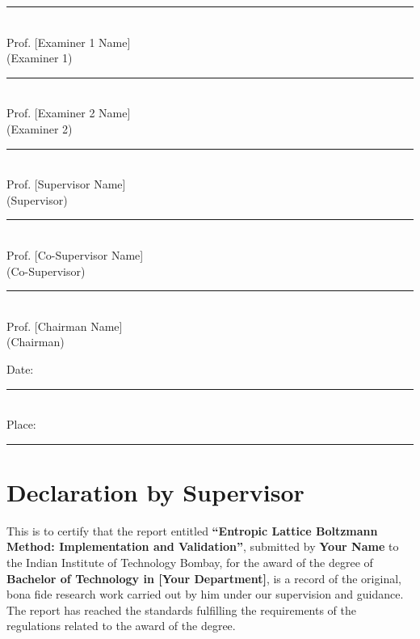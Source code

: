 \documentclass[12pt, a4paper, twoside, openright]{report}
\theoremstyle{definition}
\theoremstyle{remark}
\newcommand\myemptypage{
    \null
    \thispagestyle{empty}
    \addtocounter{page}{-1}
    \newpage
}
\def\thesistitle{Entropic Lattice Boltzmann Method: Implementation and Validation}
\def\authorname{Your Name}
\def\univname{Indian Institute of Technology Bombay}
\begin{document}
\noindent
\begin{minipage}[t]{0.45\textwidth}
\centering
\rule{6cm}{0.4pt}\\
Prof. [Examiner 1 Name]\\
(Examiner 1)
\end{minipage}%
\hfill
\begin{minipage}[t]{0.45\textwidth}
\centering
\rule{6cm}{0.4pt}\\
Prof. [Examiner 2 Name]\\
(Examiner 2)
\end{minipage}

\vspace{2cm}

\noindent
\begin{minipage}[t]{0.45\textwidth}
\centering
\rule{6cm}{0.4pt}\\
Prof. [Supervisor Name]\\
(Supervisor)
\end{minipage}%
\hfill
\begin{minipage}[t]{0.45\textwidth}
\centering
\rule{6cm}{0.4pt}\\
Prof. [Co-Supervisor Name]\\
(Co-Supervisor)
\end{minipage}

\vspace{2cm}

\noindent
\begin{center}
\rule{6cm}{0.4pt}\\
Prof. [Chairman Name]\\
(Chairman)
\end{center}

\vspace{2cm}

\noindent Date: \rule{3cm}{0.4pt}\\[0.5cm]
Place: \rule{3cm}{0.4pt}

\myemptypage

\chapter*{Declaration by Supervisor}

\noindent This is to certify that the report entitled \textbf{``\thesistitle''}, submitted by \textbf{\authorname} to the \univname, for the award of the degree of \textbf{Bachelor of Technology in [Your Department]}, is a record of the original, bona fide research work carried out by him under our supervision and guidance. The report has reached the standards fulfilling the requirements of the regulations related to the award of the degree.
\end{document}
